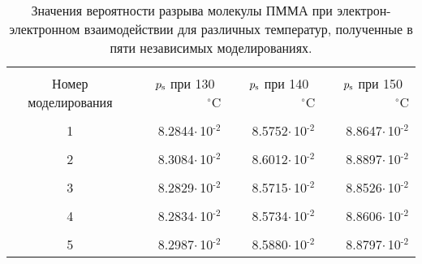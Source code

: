 \begin{table}[h]
	\caption{Значения вероятности разрыва молекулы ПММА при электрон-электронном взаимодействии для различных температур, полученные в пяти независимых моделированиях.}
	\begin{center}
		\begin{tabular}{c c r c r c r}
			\hline \hline \\[-1em]
			Номер моделирования & \hspace{0em} & $p_\mathrm{s}$ при 130~$^\circ$C & \hspace{0em} & $p_\mathrm{s}$ при 140~$^\circ$C & \hspace{0em} & $p_\mathrm{s}$ при 150~$^\circ$C \\ \hline
			\\ [-1em]
			1 & \hspace{0em} & 8.2844\:$\cdot$\,10$^\text{-2}$ & \hspace{0em} & 8.5752\:$\cdot$\,10$^\text{-2}$ & \hspace{0em} & 8.8647\:$\cdot$\,10$^\text{-2}$
			\\ \\ [-1em]
			2 & \hspace{0em} & 8.3084\:$\cdot$\,10$^\text{-2}$ & \hspace{0em} & 8.6012\:$\cdot$\,10$^\text{-2}$ & \hspace{0em} & 8.8897\:$\cdot$\,10$^\text{-2}$
			\\ \\ [-1em]
			3 & \hspace{0em} & 8.2829\:$\cdot$\,10$^\text{-2}$ & \hspace{0em} & 8.5715\:$\cdot$\,10$^\text{-2}$ & \hspace{0em} & 8.8526\:$\cdot$\,10$^\text{-2}$
			\\ \\ [-1em]
			4 & \hspace{0em} & 8.2834\:$\cdot$\,10$^\text{-2}$ & \hspace{0em} & 8.5734\:$\cdot$\,10$^\text{-2}$ & \hspace{0em} & 8.8606\:$\cdot$\,10$^\text{-2}$
			\\ \\ [-1em]
			5 & \hspace{0em} & 8.2987\:$\cdot$\,10$^\text{-2}$ & \hspace{0em} & 8.5880\:$\cdot$\,10$^\text{-2}$ & \hspace{0em} & 8.8797\:$\cdot$\,10$^\text{-2}$
			\\ \hline \hline
		\end{tabular}
		\label{table:p_s}
	\end{center}
\end{table}
